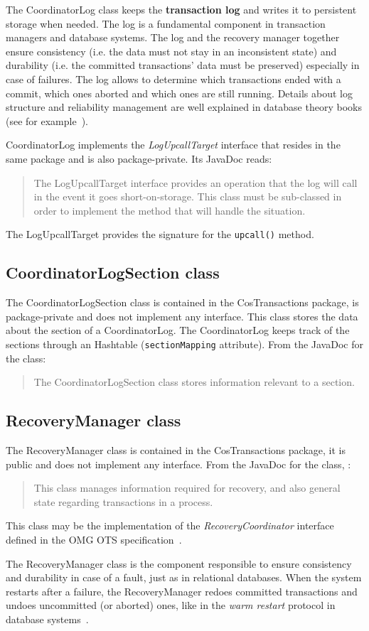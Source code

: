 The CoordinatorLog class keeps the \textbf{transaction log} and writes it to persistent storage when needed. The log is a fundamental component in transaction managers and database systems. The log and the recovery manager together ensure consistency (i.e. the data must not stay in an inconsistent state) and durability (i.e. the committed transactions' data must be preserved) especially in case of failures.
The log allows to determine which transactions ended with a commit, which ones aborted and which ones are still running.
Details about log structure and reliability management are well explained in database theory books (see for example~\cite{ceri-dbbook}).

CoordinatorLog implements the \emph{LogUpcallTarget} interface that resides in the same package and is also package-private. Its JavaDoc reads:
\begin{quote}
    The LogUpcallTarget interface provides an operation that the log will call in the event it goes short-on-storage. This class must be sub-classed in order to implement the method that will handle the situation.
\end{quote}
The LogUpcallTarget provides the signature for the \texttt{upcall()} method.

\subsection{CoordinatorLogSection class}
The CoordinatorLogSection class is contained in the CosTransactions package, is package-private and does not implement any interface.
This class stores the data about the section of a CoordinatorLog.
The CoordinatorLog keeps track of the sections through an Hashtable (\texttt{sectionMapping} attribute).
From the JavaDoc for the class:
\begin{quote}
The CoordinatorLogSection class stores information relevant to a section.
\end{quote}

\subsection{RecoveryManager class}
The RecoveryManager class is contained in the CosTransactions package, it is public and does not implement any interface. From the JavaDoc for the class, :
\begin{quote}
    This class manages information required for recovery, and also general state regarding transactions in a process.
\end{quote}

This class may be the implementation of the \emph{RecoveryCoordinator} interface defined in the OMG OTS specification~\cite[p. 47]{omg-ots}.

The RecoveryManager class is the component responsible to ensure consistency and durability in case of a fault, just as in relational databases.
When the system restarts after a failure, the RecoveryManager redoes committed transactions and undoes uncommitted (or aborted) ones, like in the \emph{warm restart} protocol in database systems~\cite[p.~319]{ceri-dbbook}.
